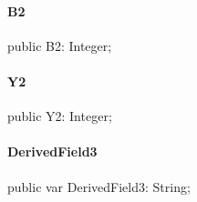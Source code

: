 \documentclass{report}
\begin{document}
\paragraph*{B2}\hspace*{\fill}

\begin{list}{}{
\setlength{\itemindent}{0cm}
\setlength{\listparindent}{0cm}
\setlength{\leftmargin}{\evensidemargin}
\addtolength{\leftmargin}{\tmplength}
\settowidth{\labelsep}{X}
\addtolength{\leftmargin}{\labelsep}
\setlength{\labelwidth}{\tmplength}
}
\begin{flushleft}
\item[\textbf{Declaration}\hfill]
\begin{ttfamily}
public B2: Integer;\end{ttfamily}


\end{flushleft}
\end{list}
\paragraph*{Y2}\hspace*{\fill}

\begin{list}{}{
\setlength{\itemindent}{0cm}
\setlength{\listparindent}{0cm}
\setlength{\leftmargin}{\evensidemargin}
\addtolength{\leftmargin}{\tmplength}
\settowidth{\labelsep}{X}
\addtolength{\leftmargin}{\labelsep}
\setlength{\labelwidth}{\tmplength}
}
\begin{flushleft}
\item[\textbf{Declaration}\hfill]
\begin{ttfamily}
public Y2: Integer;\end{ttfamily}


\end{flushleft}
\end{list}
\paragraph*{DerivedField3}\hspace*{\fill}

\begin{list}{}{
\setlength{\itemindent}{0cm}
\setlength{\listparindent}{0cm}
\setlength{\leftmargin}{\evensidemargin}
\addtolength{\leftmargin}{\tmplength}
\settowidth{\labelsep}{X}
\addtolength{\leftmargin}{\labelsep}
\setlength{\labelwidth}{\tmplength}
}
\begin{flushleft}
\item[\textbf{Declaration}\hfill]
\begin{ttfamily}
public var DerivedField3: String;\end{ttfamily}


\end{flushleft}
\end{list}
\end{document}
